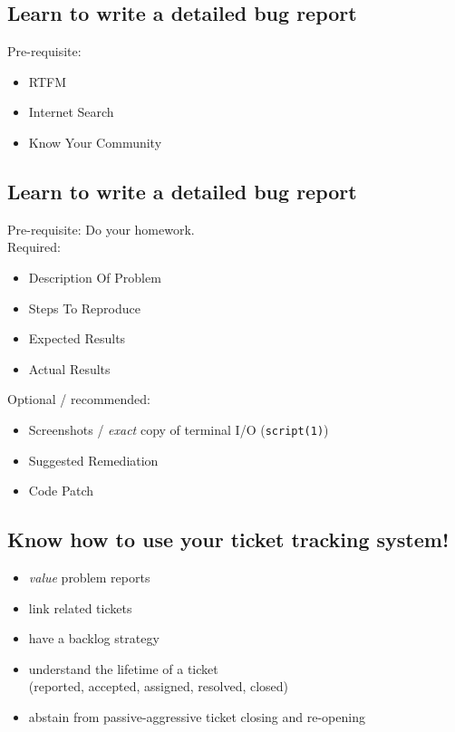\documentclass[xga]{xdvislides}
\begin{document}
\subsection{Learn to write a detailed bug report}
Pre-requisite:
\begin{itemize}
	\item RTFM
	\item Internet Search
	\item Know Your Community
\end{itemize}

\subsection{Learn to write a detailed bug report}
Pre-requisite: Do your homework. \\

Required:
\begin{itemize}
	\item Description Of Problem
	\item Steps To Reproduce
	\item Expected Results
	\item Actual Results
\end{itemize}
\vspace{.125in}

Optional / recommended:
\begin{itemize}
	\item Screenshots / {\em exact} copy of terminal I/O ({\tt script(1)})
	\item Suggested Remediation
	\item Code Patch
\end{itemize}

\subsection{Know how to use your ticket tracking system!}
\begin{itemize}
	\item {\em value} problem reports
	\item link related tickets
	\item have a backlog strategy
	\item understand the lifetime of a ticket \\
		(reported, accepted, assigned, resolved, closed)
	\item abstain from passive-aggressive ticket
		closing and re-opening
\end{itemize}
\end{document}
